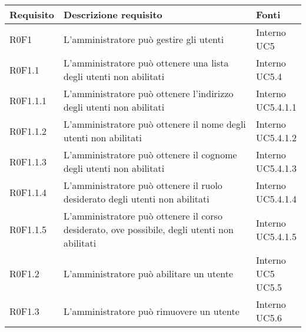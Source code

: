 \documentclass[AnalisiDeiRequisiti.tex]{subfiles}
\begin{document}
\label{table:Tabella di tracciamento requisiti-fonti}
\renewcommand*{\arraystretch}{1.2}
\begin{longtable}[H]{p{2cm}p{5.2cm}p{5cm}}
	\rowcolor{CHeader} 
	\color{CHeaderText} \textbf{Requisito} & \color{CHeaderText} \textbf{Descrizione requisito} & \color{CHeaderText} \textbf{Fonti} \\
	\endhead
	R0F1 & L'amministratore può gestire gli utenti & \makecell[tl]{
		Interno \\
		UC5
	} \\
	R0F1.1 & L'amministratore può ottenere una lista degli utenti non abilitati & \makecell[tl]{
		Interno \\
		UC5.4
	} \\
	R0F1.1.1 & L'amministratore può ottenere l'indirizzo degli utenti non abilitati & \makecell[tl]{
		Interno \\
		UC5.4.1.1
	} \\
	R0F1.1.2 & L'amministratore può ottenere il nome degli utenti non abilitati & \makecell[tl]{
		Interno \\
		UC5.4.1.2
	} \\
	R0F1.1.3 & L'amministratore può ottenere il cognome degli utenti non abilitati & \makecell[tl]{
		Interno \\
		UC5.4.1.3
	} \\
	R0F1.1.4 & L'amministratore può ottenere il ruolo desiderato degli utenti non abilitati & \makecell[tl]{
		Interno \\
		UC5.4.1.4
	} \\
	R0F1.1.5 & L'amministratore può ottenere il corso desiderato, ove possibile, degli utenti non abilitati & \makecell[tl]{
		Interno \\
		UC5.4.1.5
	} \\

	R0F1.2 & L'amministratore può abilitare un utente & \makecell[tl]{
		Interno \\ 
		UC5 \\ 
		UC5.5
	} \\
	R0F1.3 & L'amministratore può rimuovere un utente & \makecell[tl]{
		Interno \\ 
		UC5.6
	} \\


\end{longtable}
\end{document}
